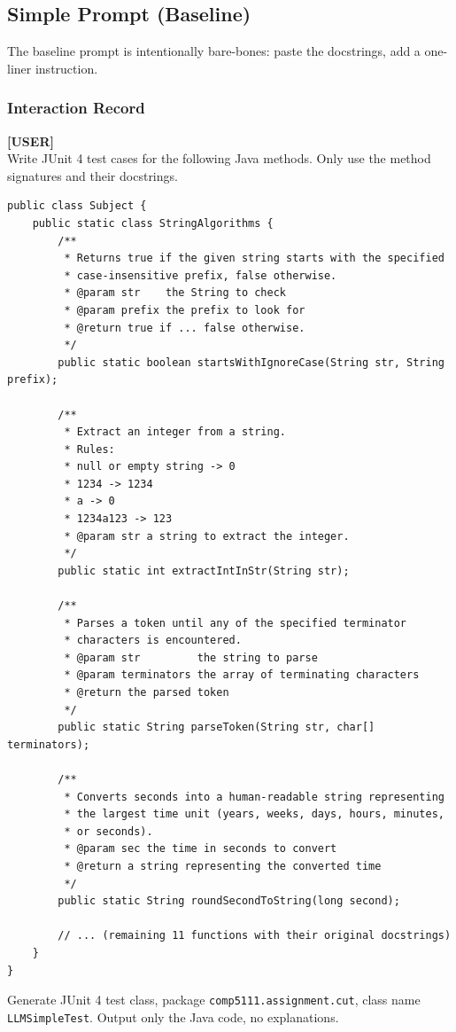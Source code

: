 \documentclass[acmsmall,nonacm]{acmart}
\begin{document}
\subsection{Simple Prompt (Baseline)}

The baseline prompt is intentionally bare-bones: paste the docstrings, add a one-liner instruction.

\subsubsection*{Interaction Record}

\begin{promptbox}
\textbf{[USER]}\\[4pt]
Write JUnit 4 test cases for the following Java methods. Only use the method signatures and their docstrings.

\begin{verbatim}
public class Subject {
    public static class StringAlgorithms {
        /**
         * Returns true if the given string starts with the specified
         * case-insensitive prefix, false otherwise.
         * @param str    the String to check
         * @param prefix the prefix to look for
         * @return true if ... false otherwise.
         */
        public static boolean startsWithIgnoreCase(String str, String prefix);

        /**
         * Extract an integer from a string.
         * Rules:
         * null or empty string -> 0
         * 1234 -> 1234
         * a -> 0
         * 1234a123 -> 123
         * @param str a string to extract the integer.
         */
        public static int extractIntInStr(String str);

        /**
         * Parses a token until any of the specified terminator
         * characters is encountered.
         * @param str         the string to parse
         * @param terminators the array of terminating characters
         * @return the parsed token
         */
        public static String parseToken(String str, char[] terminators);

        /**
         * Converts seconds into a human-readable string representing
         * the largest time unit (years, weeks, days, hours, minutes,
         * or seconds).
         * @param sec the time in seconds to convert
         * @return a string representing the converted time
         */
        public static String roundSecondToString(long second);

        // ... (remaining 11 functions with their original docstrings)
    }
}
\end{verbatim}

Generate JUnit 4 test class, package \texttt{comp5111.assignment.cut},
class name \texttt{LLMSimpleTest}. Output only the Java code, no explanations.
\end{promptbox}
\end{document}
